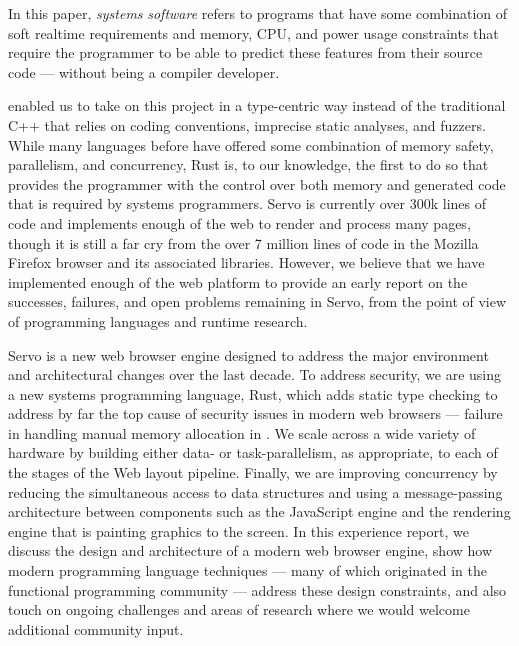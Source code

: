 In this paper, \emph{systems} \emph{software} refers to programs that have some combination
of soft realtime requirements and memory, CPU, and power usage constraints that require the
programmer to be able to predict these features from their source code --- without being a
compiler developer.

enabled us to take on this project in a type-centric way instead of
the traditional C++ that relies on coding conventions, imprecise static analyses, and
fuzzers.
While many languages before have offered some combination of memory safety, parallelism,
and concurrency, Rust is, to our knowledge, the first to do so that provides the programmer
with the control over both memory and generated code that is required by systems programmers.
Servo is currently over 300k lines of code and implements enough of the web to render and
process many pages, though it is still a far cry from the over 7 million lines of code in
the Mozilla Firefox browser and its associated libraries.
However, we believe that we have implemented enough of the web platform to provide an
early report on the successes, failures, and open problems remaining in Servo, from the
point of view of programming languages and runtime research.


Servo is a new web browser engine designed to address the major environment and 
architectural changes over the last decade.
To address security, we are using a new systems programming language, Rust,
which adds static type checking to address by far the top cause of security
issues in modern web browsers --- failure in handling manual memory allocation
in \Cplusplus{}.
We scale across a wide variety of hardware by building either data- or task-parallelism, 
as appropriate, to each of the stages of the Web layout pipeline.
Finally, we are improving concurrency by reducing the simultaneous access to data
structures and using a message-passing architecture between components such as the
JavaScript engine and the rendering engine that is painting graphics to the screen.
In this experience report, we discuss the design and architecture of a modern web 
browser engine, show how modern programming language techniques --- many of which
originated in the functional programming community --- address these design 
constraints, and also touch on ongoing challenges and areas of research where we
would welcome additional community input.

